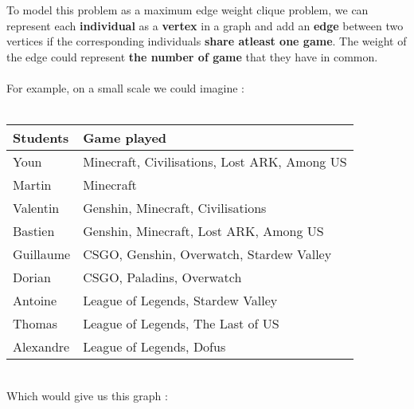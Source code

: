     \\ \\
    To model this problem as a maximum edge weight clique problem, we can represent each \textbf{individual} as a \textbf{vertex} in a graph and add an \textbf{edge} between two vertices if the corresponding individuals \textbf{share atleast one game}. The weight of the edge could represent \textbf{the number of game} that they have in common.
    \\ \\
    For example, on a small scale we could imagine :
    \\ \\
    \begin{tabular}{|p{}|p{}|}
        \hline
        \textbf{Students} & \textbf{Game played} \\
        \hline
        Youn & Minecraft, Civilisations, Lost ARK, Among US \\
        \hline
        Martin & Minecraft \\
        \hline
        Valentin & Genshin, Minecraft, Civilisations \\
        \hline
        Bastien & Genshin, Minecraft, Lost ARK, Among US \\
        \hline
        Guillaume & CSGO, Genshin, Overwatch, Stardew Valley\\
        \hline
        Dorian & CSGO, Paladins, Overwatch \\
        \hline
        Antoine & League of Legends, Stardew Valley \\
        \hline
        Thomas & League of Legends, The Last of US \\
        \hline
        Alexandre & League of Legends, Dofus \\
        \hline
    \end{tabular}
    \vspace{1\baselineskip} \\
    Which would give us this graph :

    \begin{center}
    \end{center}
    
